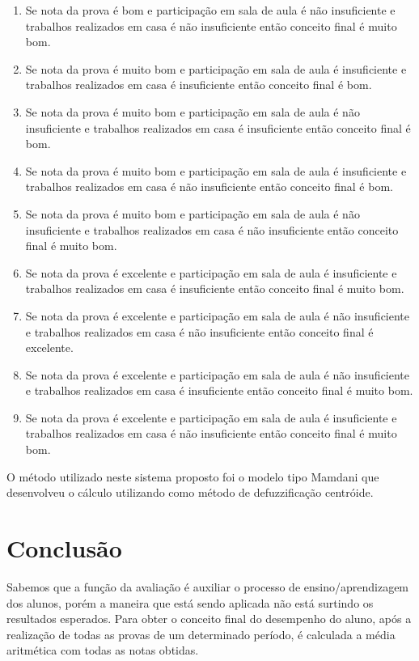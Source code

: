 \documentclass{article}
\begin{document}
\begin{enumerate}
	\item Se nota da prova é bom e participação em sala de aula é não
		insuficiente e trabalhos realizados em casa é não insuficiente
		então conceito final é muito bom.

	\item Se nota da prova é muito bom e participação em sala de aula
		é insuficiente e trabalhos realizados em casa é insuficiente
		então conceito final é bom.

	\item Se nota da prova é muito bom e participação em sala de aula
		é não insuficiente e trabalhos realizados em casa é
		insuficiente então conceito final é bom.

	\item Se nota da prova é muito bom e participação em sala de aula
		é insuficiente e trabalhos realizados em casa é não
		insuficiente então conceito final é bom.

	\item Se nota da prova é muito bom e participação em sala de aula
		é não insuficiente e trabalhos realizados em casa é não
		insuficiente então conceito final é muito bom.

	\item Se nota da prova é excelente e participação em sala de aula
		é insuficiente e trabalhos realizados em casa é insuficiente
		então conceito final é muito bom.

	\item Se nota da prova é excelente e participação em sala de aula
		é não insuficiente e trabalhos realizados em casa é não
		insuficiente então conceito final é excelente.

	\item Se nota da prova é excelente e participação em sala de aula
		é não insuficiente e trabalhos realizados em casa é
		insuficiente então conceito final é muito bom.

	\item Se nota da prova é excelente e participação em sala de aula
		é insuficiente e trabalhos realizados em casa é não
		insuficiente então conceito final é muito bom.

\end{enumerate}

O método utilizado neste sistema proposto foi o modelo tipo
Mamdani que desenvolveu o cálculo utilizando como método de
defuzzificação centróide.

\section{Conclusão}
Sabemos que a função da avaliação é auxiliar o processo de
ensino/aprendizagem dos alunos, porém a maneira que está sendo
aplicada não está surtindo os resultados esperados. Para obter
o conceito final do desempenho do aluno, após a realização
de todas as provas de um determinado período, é calculada a
média aritmética com todas as notas obtidas.
\end{document}
